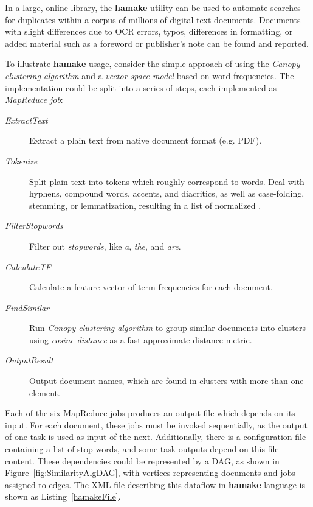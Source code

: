 \documentclass[a4paper,twoside]{article}
\begin{document}
In a large, online library, the \textbf{hamake} utility can be used to automate searches for duplicates within a corpus of millions of digital text documents. Documents with slight differences due to OCR errors, typos, differences in formatting, or added material such as a foreword or publisher’s note can be found and reported.
 
To illustrate \textbf{hamake} usage, consider the simple approach of using the \textit{Canopy clustering algorithm}\cite{efficientClustering} and a \textit{vector space model}\cite{manning2008introduction} based on word frequencies. The implementation could be split into a series of steps, each implemented as \textit{MapReduce job}:

\begin{description}
\item[\emph{ExtractText}] Extract a plain text from native document format
  (e.g. PDF).
\item[\emph{Tokenize}] Split plain text into tokens which roughly
  correspond to words. Deal with hyphens, compound words,
  accents, and diacritics, as well as case-folding, stemming, or lemmatization, resulting in a list of normalized .
\item[\emph{FilterStopwords}] Filter out \textit{stopwords}, 
  like \textit{a}, \textit{the}, and \textit{are}.
\item[\emph{CalculateTF}]  Calculate a feature vector of term frequencies for each document.
\item[\emph{FindSimilar}] Run \textit{Canopy clustering algorithm}
  to group similar documents into clusters using
  \textit{cosine distance} as a fast approximate distance metric. 
\item[\emph{OutputResult}] Output document names, which are found in
  clusters with more than one element.
\end{description}

Each of the six MapReduce jobs produces an output file which
depends on its input. For each document, these jobs must be invoked
sequentially, as the output of one task is used as input of the next. Additionally, there is a configuration file containing a list of
stop words, and some task outputs depend on this file content. These
dependencies could be represented by a DAG, as shown in Figure~\ref{fig:SimilarityAlgDAG}, with vertices representing documents and jobs assigned to edges. The XML file describing this dataflow in \textbf{hamake} language is shown as
Listing~\ref{hamakeFile}.
\end{document}
